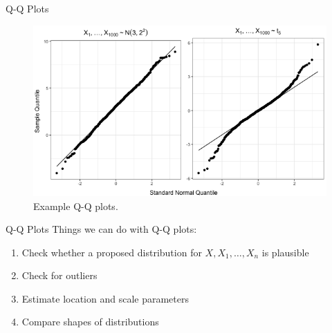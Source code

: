 \documentclass{beamer}
\begin{document}
\begin{frame}{Q-Q Plots}
    \begin{figure}
        \centering
        \includegraphics[scale=0.5]{qq_plots.png}
        \caption{Example Q-Q plots.}
        \label{fig:qq_plots}
    \end{figure}
\end{frame}

\begin{frame}{Q-Q Plots}
    Things we can do with Q-Q plots:
    \begin{enumerate}
        \item Check whether a proposed distribution for $X, X_1, \ldots, X_n$ is plausible
        \item Check for outliers
        \item Estimate location and scale parameters
        \item Compare shapes of distributions
    \end{enumerate}
\end{frame}
\end{document}
